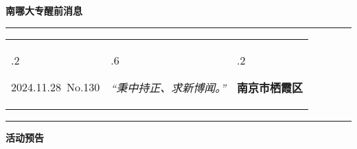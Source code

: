 \documentclass[letterpaper, 12pt]{article}
\begin{document}
\begin{center}
    \Huge\textbf{南哪大专醒前消息}
\end{center}
\vspace{4mm}
\hrule
\renewcommand\tabularxcolumn[1]{m{#1}}
\begin{tabularx}{\textwidth}{>{\hsize.2\hsize}X>{\hsize.6\hsize}X>{\hsize.2\hsize}X}
    \begin{flushleft}
        2024.11.28\, No.130
    \end{flushleft}
    &
    \begin{center}
        \textit{“秉中持正、求新博闻。”}
    \end{center}
    &
    \begin{flushright}
        \textbf{南京市栖霞区}
    \end{flushright}
\end{tabularx}
\vspace{-3.5mm}
\hrule
\vspace{4mm}
\centerline{\huge\textbf{活动预告}}
\end{document}
